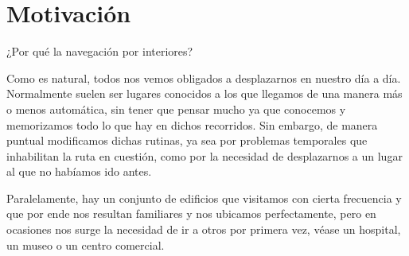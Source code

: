 


\section{Motivación}


	

¿Por qué la navegación por interiores?

Como es natural, todos nos vemos obligados a desplazarnos en nuestro día a día. Normalmente suelen ser lugares conocidos a los que llegamos de una manera más o menos automática, sin tener que pensar mucho ya que conocemos y memorizamos todo lo que hay en dichos recorridos. Sin embargo, de manera puntual modificamos dichas rutinas, ya sea por problemas temporales que inhabilitan la ruta en cuestión, como por la necesidad de desplazarnos a un lugar al que no habíamos ido antes.

Paralelamente, hay un conjunto de edificios que visitamos con cierta frecuencia y que por ende nos resultan familiares y nos ubicamos perfectamente, pero en ocasiones nos surge la necesidad de ir a otros por primera vez, véase un hospital, un museo o un centro comercial. 


